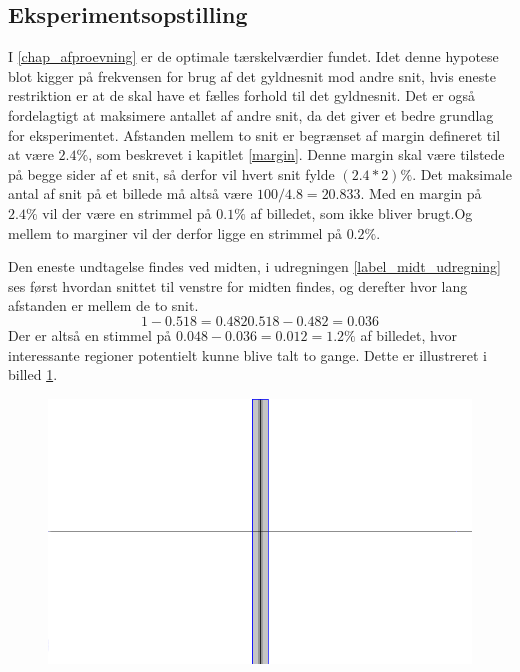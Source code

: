 {\subsection{Eksperimentsopstilling}
I \ref{chap_afproevning} er de optimale tærskelværdier fundet.  Idet
denne hypotese blot kigger på frekvensen for brug af det gyldnesnit mod
andre snit, hvis eneste restriktion er at de skal have et fælles forhold
til det gyldnesnit.  Det er også fordelagtigt at maksimere antallet af
andre snit, da det giver et bedre grundlag for eksperimentet.  Afstanden
mellem to snit er begrænset af margin defineret til at være
$2.4\%$, som beskrevet i kapitlet \ref{margin}.  Denne margin skal være tilstede på begge sider af
et snit, så derfor vil hvert snit fylde $(2.4*2)\%$.  Det maksimale
antal af snit på et billede må altså være $100/4.8=20.833$.
Med en margin på $2.4\%$ vil der være en strimmel på $0.1\%$ af
billedet, som ikke bliver brugt.Og mellem to marginer vil der derfor ligge en
strimmel på $0.2\%$. 

Den eneste undtagelse findes ved midten, i udregningen
\ref{label_midt_udregning} ses først hvordan snittet til venstre for
midten findes, og derefter hvor lang afstanden er mellem de to snit.
\begin{equation}\label{resul_midt_udregningen}
    1-0.518 = 0.482
    0.518-0.482 = 0.036
\end{equation}
Der er altså en stimmel på $0.048-0.036 = 0.012 = 1.2\%$ af
billedet, hvor interessante regioner potentielt kunne blive talt to gange.
Dette er illustreret i billed \ref{resultat_fejl_midt}.
\begin{figure}[!h]
	\centering
	\includegraphics[scale=0.5]{afsnit/resultater/billeder/midt_strimmel}
	\label{resultat_fejl_midt}
\end{figure}

}

